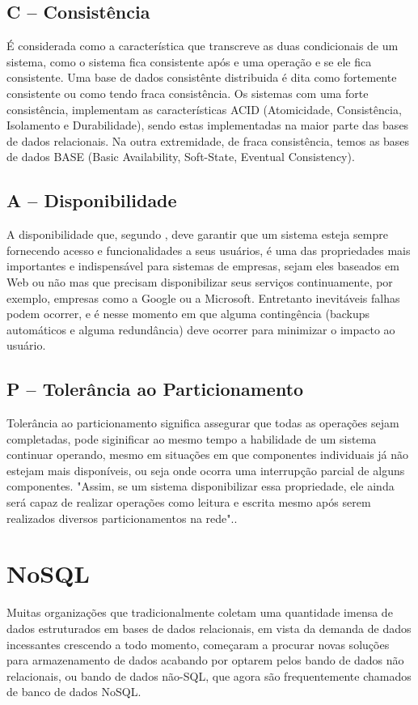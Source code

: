 \subsection{ C – Consistência }
É considerada como a característica que transcreve as duas condicionais de um sistema, como o sistema fica consistente após e
uma operação e se ele fica consistente. Uma base de dados consistênte distribuida é dita como fortemente consistente ou 
como tendo fraca consistência. Os sistemas com uma forte consistência, implementam as características ACID 
(Atomicidade, Consistência, Isolamento e Durabilidade), sendo estas implementadas na maior parte das bases de dados relacionais. 
Na outra extremidade, de fraca consistência, temos as bases de dados BASE (Basic Availability, Soft-State, Eventual 
Consistency).

\subsection{ A – Disponibilidade }
A disponibilidade que, segundo \cite{BROWNE}, deve garantir que um sistema esteja sempre fornecendo acesso e funcionalidades a seus usuários, 
é uma das propriedades mais importantes e indispensável para sistemas de empresas, sejam eles baseados em Web ou não mas  que precisam disponibilizar
seus serviços continuamente, por exemplo, empresas como a Google ou a Microsoft. Entretanto inevitáveis falhas podem ocorrer, e é nesse momento em que 
alguma contingência (backups automáticos e alguma redundância) deve ocorrer para minimizar o impacto ao usuário.

\subsection{ P – Tolerância ao Particionamento }
Tolerância ao particionamento significa assegurar que todas as operações sejam completadas, pode siginificar ao mesmo tempo a habilidade de um sistema
continuar operando, mesmo em situações em que componentes individuais já não estejam mais disponíveis, ou seja onde ocorra uma interrupção parcial de alguns 
componentes. "Assim, se um sistema disponibilizar essa propriedade, ele ainda será capaz de realizar operações como leitura e escrita mesmo após 
serem realizados diversos particionamentos na rede".\cite{GILBERT,NANCY}.

\section{NoSQL}
Muitas organizações que tradicionalmente coletam uma quantidade imensa de dados estruturados em bases de dados relacionais, em vista da demanda de dados incessantes crescendo
a todo momento, começaram a procurar novas soluções para armazenamento de dados acabando por optarem pelos bando de dados não relacionais, ou bando de dados não-SQL, que agora são 
frequentemente chamados de banco de dados NoSQL.

